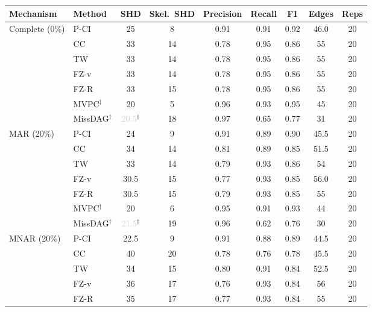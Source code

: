 \begin{tabular}{llccccccc}
    \toprule
    Mechanism & Method & SHD & Skel.\ SHD & Precision & Recall & F1 & Edges & Reps \\
    \midrule
    Complete (0\%)   & P-CI               & 25 & 8 & 0.91 & 0.91 & 0.92 & 46.0 & 20 \\
                     & CC                 & 33 & 14 & 0.78 & 0.95 & 0.86 & 55 & 20 \\
                     & TW                 & 33 & 14 & 0.78 & 0.95 & 0.86 & 55 & 20 \\
                     & FZ-v               & 33 & 14 & 0.78 & 0.95 & 0.86 & 55 & 20 \\
                     & FZ-R               & 33 & 15 & 0.78 & 0.95 & 0.86 & 55 & 20 \\
                     & MVPC$^\ddagger$    & 20 & 5 & 0.96 & 0.93 & 0.95 & 45 & 20 \\
                     & MissDAG$^\dagger$  & \textcolor{lightgray}{20.5}$^\dagger$ & 18 & 0.97 & 0.65 & 0.77 & 31 & 20 \\
    \midrule
    MAR (20\%)       & P-CI               & 24 & 9 & 0.91 & 0.89 & 0.90 & 45.5 & 20 \\
                     & CC                 & 34 & 14 & 0.81 & 0.89 & 0.85 & 51.5 & 20 \\
                     & TW                 & 33 & 14 & 0.79 & 0.93 & 0.86 & 54 & 20 \\
                     & FZ-v               & 30.5 & 15 & 0.77 & 0.93 & 0.85 & 56.0 & 20 \\
                     & FZ-R               & 30.5 & 15 & 0.79 & 0.93 & 0.85 & 55 & 20 \\
                     & MVPC$^\ddagger$    & 20 & 6 & 0.95 & 0.91 & 0.93 & 44 & 20 \\
                     & MissDAG$^\dagger$  & \textcolor{lightgray}{21.5}$^\dagger$ & 19 & 0.96 & 0.62 & 0.76 & 30 & 20 \\
    \midrule
    MNAR (20\%)      & P-CI               & 22.5 & 9 & 0.91 & 0.88 & 0.89 & 44.5 & 20 \\
                     & CC                 & 40 & 20 & 0.78 & 0.76 & 0.78 & 45.5 & 20 \\
                     & TW                 & 34 & 15 & 0.80 & 0.91 & 0.84 & 52.5 & 20 \\
                     & FZ-v               & 36 & 17 & 0.76 & 0.93 & 0.84 & 56 & 20 \\
                     & FZ-R               & 35 & 17 & 0.77 & 0.93 & 0.84 & 55 & 20 \\

\end{tabular}
